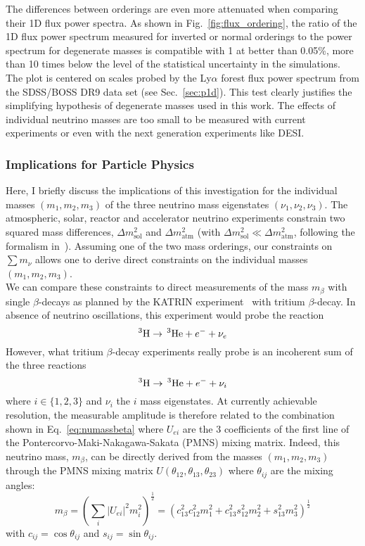 The differences between orderings are even more attenuated when comparing their 1D flux power spectra. As shown in Fig.~\ref{fig:flux_ordering}, the ratio of the 1D flux power spectrum measured for inverted or normal orderings to the power spectrum for degenerate masses is compatible with 1 at better than 0.05\%, more than 10 times below the level of the statistical uncertainty in the simulations. The plot is centered on scales probed by the Ly$\alpha$ forest flux power spectrum from the SDSS/BOSS DR9 data set (see Sec.~\ref{sec:p1d}). This test clearly justifies the simplifying hypothesis of degenerate masses used in this work. The effects of individual neutrino masses are too small to be measured with current experiments or even with the next generation experiments like DESI.\\

\subsubsection{Implications for Particle Physics}

Here, I briefly discuss the implications of this investigation for the individual masses $(m_1,m_2,m_3)$ of the three neutrino mass eigenstates $(\nu_1,\nu_2,\nu_3)$.  The atmospheric, solar, reactor and accelerator neutrino experiments constrain two squared mass differences, $\Delta m^2_\mathrm{sol}$ and  $\Delta m^2_\mathrm{atm}$ (with $\Delta m^2_\mathrm{sol} \ll \Delta m^2_\mathrm{atm}$, following the formalism in~\cite{Capozzi2013csa}). Assuming one of the two mass orderings, our constraints on $\sum m_\nu$ allows one to derive direct constraints on the individual masses $(m_1,m_2,m_3)$. \\

We can compare these constraints to  direct measurements of the mass  $m_\beta$ with single $\beta$-decays as planned by the KATRIN experiment~\cite{Osipowicz2001sq} with tritium $\beta$-decay.  In absence of neutrino oscillations, this experiment would probe the reaction
$$ ^{3}{\rm H} \rightarrow \, ^{3}{\rm He} + e^- + \nu_e$$
However, what tritium $\beta$-decay experiments really probe is an incoherent sum of the three reactions
$$ ^{3}{\rm H} \rightarrow \, ^{3}{\rm He} + e^- + \nu_i$$
where $i \in \lbrace 1,2,3 \rbrace$ and $\nu_i$ the $i$ mass eigenstates. At currently achievable resolution, the measurable amplitude is therefore related to the combination  shown in Eq.~\ref{eq:numassbeta} where $U_{ei}$ are the 3 coefficients of the first line of the  Pontercorvo-Maki-Nakagawa-Sakata (PMNS)  mixing matrix.    
Indeed, this neutrino mass,  $m_\beta$, can be directly derived from the masses $(m_1,m_2,m_3)$  through the PMNS mixing matrix $U(\theta_{12}, \theta_{13},\theta_{23})$ where $\theta_{ij}$ are the mixing angles:
\begin{equation}
m_\beta =  \left( \sum_i |U_{ei}|^2 m_i^2 \right)^\frac{1}{2}=\left( c_{13}^2  c_{12}^2 m_1^2  +  c_{13}^2  s_{12}^2 m_2^2 +  s_{13}^2  m_3^2 \right)^\frac{1}{2}
\label{eq:numassbeta}
\end{equation}
with  $c_{ij}=\cos\theta_{ij}$ and $s_{ij}=\sin\theta_{ij}$. \\


